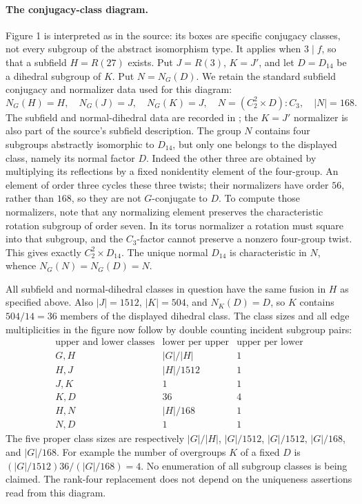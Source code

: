 \documentclass[11pt,a4paper]{article}
\begin{document}
\paragraph{The conjugacy-class diagram.}
Figure 1 is interpreted as in the source: its boxes are specific
conjugacy classes, not every subgroup of the abstract isomorphism
type. It applies when $3\mid f$, so that a subfield $H=R(27)$ exists.
Put $J=R(3)$, $K=J'$, and let $D=D_{14}$ be a dihedral subgroup
of $K$. Put $N=N_G(D)$. We retain the standard subfield conjugacy
and normalizer data used for this diagram:
\[
 N_G(H)=H,\quad N_G(J)=J,\quad N_G(K)=J,\quad
 N=(C_2^2\times D):C_3,\quad |N|=168.
\]
The subfield and normal-dihedral data are recorded in
\cite[Lemmas 2.5, 2.7, 2.9--2.10]{Pierro}; the $K=J'$ normalizer
is also part of the source's subfield description.
The group $N$ contains four subgroups abstractly isomorphic to
$D_{14}$, but only one belongs to the displayed class, namely its
normal factor $D$. Indeed the other three are obtained by multiplying
its reflections by a fixed nonidentity element of the four-group.
An element of order three cycles these three twists; their
normalizers have order $56$, rather than $168$, so they are not
$G$-conjugate to $D$. To compute those normalizers, note that any
normalizing element preserves the characteristic rotation subgroup
of order seven. In its torus normalizer a rotation must square into
that subgroup, and the $C_3$-factor cannot preserve a nonzero
four-group twist. This gives exactly $C_2^2\times D_{14}$.
The unique normal $D_{14}$ is characteristic in $N$, whence
$N_G(N)=N_G(D)=N$.

All subfield and normal-dihedral classes in question have the same
fusion in $H$ as specified above. Also $|J|=1512$, $|K|=504$, and
$N_K(D)=D$, so $K$ contains $504/14=36$ members of the displayed
dihedral class. The class sizes and all edge multiplicities in the
figure now follow by double counting incident subgroup pairs:
\[
\begin{array}{c|c|c}
 \text{upper and lower classes}&\text{lower per upper}&\text{upper per lower}\\\hline
 G,H&|G|/|H|&1\\
 H,J&|H|/1512&1\\
 J,K&1&1\\
 K,D&36&4\\
 H,N&|H|/168&1\\
 N,D&1&1
\end{array}
\]
The five proper class sizes are respectively $|G|/|H|$,
$|G|/1512$, $|G|/1512$, $|G|/168$, and $|G|/168$.
For example the number of overgroups $K$ of a fixed $D$ is
$(|G|/1512)36/(|G|/168)=4$. No enumeration of all subgroup
classes is being claimed. The rank-four replacement does not depend
on the uniqueness assertions read from this diagram.
\end{document}
